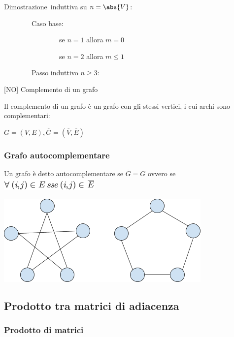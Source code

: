 \documentclass{article}
\begin{document}
{Dimostrazione}{~induttiva su $n=\abs{V}$:}

{~~~~~~~~Caso base:}

{~~~~~~~~~~~~~~~~se $n=1$ allora $m = 0$

{~~~~~~~~~~~~~~~~se $n=2$ allora $m \leq 1$

{~~~~~~~~Passo induttivo $n \geq 3$:}



{{[}NO{]} Complemento di un grafo}

{Il complemento di un grafo è un grafo con gli stessi vertici, i cui
archi sono complementari:}

$G=(V,E), \overline{G}=(\overline{V},\overline{E})$

{}

\hypertarget{h.tsrwv4qy0dku}{\subsubsection{\texorpdfstring{{Grafo
autocomplementare}}{Grafo autocomplementare}}\label{h.tsrwv4qy0dku}}

{Un grafo è detto autocomplementare se $\overline{G}=G$ ovvero se
}\includegraphics{images/image405.png}

{\includegraphics{images/image532.png}}

{}

\hypertarget{h.akx1r9fzvwzo}{\subsection{\texorpdfstring{{Prodotto tra
matrici di
adiacenza}}{Prodotto tra matrici di adiacenza}}\label{h.akx1r9fzvwzo}}

{}

\hypertarget{h.c39ti8il3qtf}{\subsubsection{\texorpdfstring{{Prodotto di
matrici}}{Prodotto di matrici}}\label{h.c39ti8il3qtf}}

}}
\end{document}
